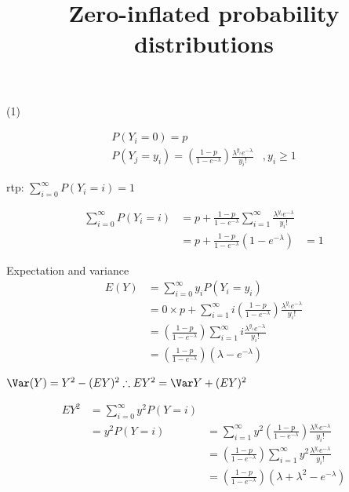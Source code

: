 \documentclass{amsart}
\title{Zero-inflated probability distributions}
\begin{document}
\maketitle

(1)

\begin{equation*}
\begin{array}{ll}
P(Y_i = 0) = p & \\
P(Y_j = y_i) = \left (\frac{1 - p}{1 - e^{-\lambda}}\right ) \frac{\lambda^{y_i} e^{-\lambda}}{y_i !} &, y_i \geq 1
\end{array}
\end{equation*}

rtp: $\sum_{i=0}^{\infty} P(Y_i = i) = 1$

\begin{equation*}
\begin{array}{lll}
\sum_{i=0}^{\infty} P(Y_i = i) &= p + \frac{1-p}{1 - e^{-\lambda}} \sum_{i=1}^{\infty} \frac{\lambda^{y_i} e^{-\lambda}}{y_i !} & \\
&= p + \frac{1 - p}{1 - e^{-\lambda}} (1 - e^{-\lambda}) &= 1
\end{array}
\end{equation*}

Expectation and variance
\begin{equation*}
\begin{array}{ll}
E(Y) &= \sum_{i=0}^{\infty} y_i P(Y_i = y_i) \\
&= 0 \times p + \sum_{i=1}^{\infty} i \left( \frac{1 - p}{1 - e^{-\lambda}} \right) \frac{\lambda^{y_i} e^{-\lambda}}{y_i !} \\
&= \left( \frac{1 - p}{1 - e^{-\lambda}} \right) \sum_{i=1}^{\infty} i \frac{\lambda^{y_i} e^{-\lambda}}{y_i !} \\
&= \left( \frac{1 - p}{1 - e^{-\lambda}} \right) (\lambda - e^{-\lambda})
\end{array}
\end{equation*}

$\Var(Y) = Y^2 - (EY)^2 \therefore E Y^2 = \Var Y + (E Y)^2$

\begin{equation*}
\begin{array}{lll}
E Y^2 &= \sum_{i=0}^{\infty} y^2 P(Y=i) & \\
&= y^2 P(Y=i) &= \sum_{i=1}^{\infty} y^2 \left( \frac{1 - p}{1 - e^{-\lambda}} \right) \frac{\lambda^{y_i} e^{-\lambda}}{y_i !} \\
&&= \left( \frac{1 - p}{1 - e^{-\lambda}} \right) \sum_{i=1}^{\infty}  y^2 \frac{\lambda^{y_i} e^{-\lambda}}{y_i !} \\
&&= \left( \frac{1 - p}{1 - e^{-\lambda}} \right) (\lambda + \lambda^2 - e^{-\lambda})
\end{array}
\end{equation*}
\end{document}

